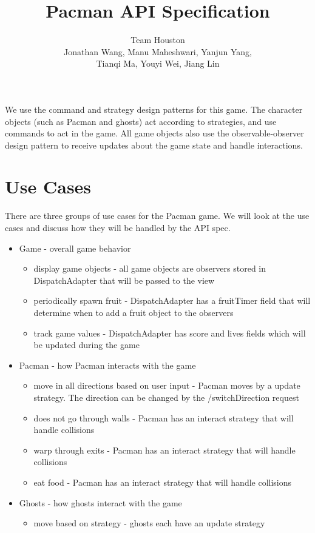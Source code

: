 \documentclass[letterpaper, 11pt]{article}
\title{Pacman API Specification}
\author{Team Houston\\ Jonathan Wang, Manu Maheshwari, Yanjun Yang,\\ Tianqi Ma, Youyi Wei, Jiang Lin}
\date{}
\begin{document}
\maketitle
We use the command and strategy design patterns for this game. The character objects (such as Pacman and ghosts) act according to strategies, and use commands to act in the game. All game objects also use the observable-observer design pattern to receive updates about the game state and handle interactions.  

\section{Use Cases}
There are three groups of use cases for the Pacman game. We will look at the use cases and discuss how they will be handled by the API spec.
\begin{itemize}
  \item Game - overall game behavior
  \begin{itemize}
    \item display game objects - all game objects are observers stored in DispatchAdapter that will be passed to the view
    \item periodically spawn fruit - DispatchAdapter has a fruitTimer field that will determine when to add a fruit object to the observers
    \item track game values - DispatchAdapter has score and lives fields which will be updated during the game
  \end{itemize}
  \item Pacman - how Pacman interacts with the game
  \begin{itemize}
    \item move in all directions based on user input - Pacman moves by a update strategy. The direction can be changed by the /switchDirection request
    \item does not go through walls - Pacman has an interact strategy that will handle collisions
    \item warp through exits - Pacman has an interact strategy that will handle collisions
    \item eat food - Pacman has an interact strategy that will handle collisions
  \end{itemize}
  \item Ghosts - how ghosts interact with the game
  \begin{itemize}
    \item move based on strategy - ghosts each have an update strategy

\end{itemize}
\end{itemize}
\end{document}
